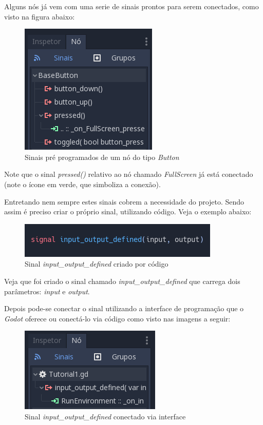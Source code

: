 Alguns nós já vem com uma serie de sinais prontos para serem conectados, como
visto na figura abaixo:

\begin{figure}[H]
    \includegraphics[scale=0.4]{../figuras/sinais_pre_programados.png}
    \caption{Sinais pré programados de um nó do tipo \textit{Button}}
\end{figure}

Note que o sinal \textit{pressed()} relativo ao nó chamado \textit{FullScreen} 
já está conectado (note o ícone em verde, que simboliza a conexão).

Entretando nem sempre estes sinais cobrem a necessidade do projeto. Sendo assim
é preciso criar o próprio sinal, utilizando código. Veja o exemplo abaixo:

\begin{figure}[H]
    \includegraphics[scale=0.6]{../figuras/criando_sinal_via_codigo.png}
    \caption{Sinal \textit{input\_output\_defined} criado por código}
\end{figure}

Veja que foi criado o sinal chamado \textit{input\_output\_defined} que
carrega dois parâmetros: \textit{input} e \textit{output}. 

Depois pode-se conectar o sinal utilizando a interface de programação
que o \textit{Godot} oferece ou conectá-lo via código como visto nas imagens
a seguir:

\begin{figure}[H]
    \includegraphics[scale=0.8]{../figuras/sinal_conectado_interface.png}
    \caption{Sinal \textit{input\_output\_defined} conectado via interface}
\end{figure}

